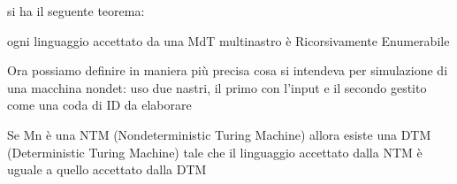 \begin{itemize}
\begin{center}

	  \end{center}
\end{itemize}
si ha il seguente teorema:
\begin{theorem}
ogni linguaggio accettato da una MdT multinastro è Ricorsivamente Enumerabile
\end{theorem}
Ora possiamo definire in maniera più precisa cosa si intendeva per simulazione di una macchina
nondet: uso due nastri, il primo con l'input e il secondo gestito come una coda di ID da elaborare
\begin{theorem}
Se Mn è una NTM (Nondeterministic Turing Machine) allora esiste una DTM
(Deterministic Turing Machine) tale che il linguaggio accettato dalla NTM è uguale a quello accettato
dalla DTM
\end{theorem}
